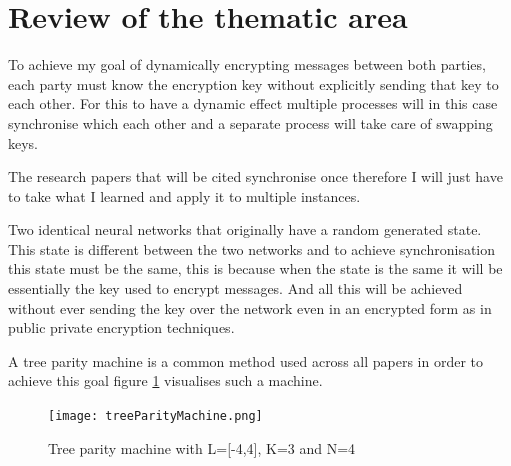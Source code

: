 
%
%
%
%

%
%
%
%
\section{Review of the thematic area}
To achieve my goal of dynamically encrypting messages between both parties, each party must know the encryption key without explicitly sending that key to each other. For this to have a dynamic effect multiple processes will in this case synchronise which each other and a separate process will take care of swapping keys.

The research papers that will be cited synchronise once therefore I will just have to take what I learned and apply it to multiple instances.

Two identical neural networks that originally have a random generated state. This state is different between the two networks and to achieve synchronisation this state must be the same, this is because when the state is the same it will be essentially the key used to encrypt messages. And all this will be achieved without ever sending the key over the network even in an encrypted form as in public private encryption techniques. 

A tree parity machine is a common method used across all papers in order to achieve this goal figure \ref{fig:treeParityMachine} visualises such a machine.

\begin{figure}[ht]
  \centering
      \texttt{[image: treeParityMachine.png]}
  \caption[Tree parity machine]{Tree parity machine with L=[-4,4], K=3 and N=4\cite{Private_Inputs_to_Tree_Parity_Machine}}
  \label{fig:treeParityMachine}
\end{figure}

